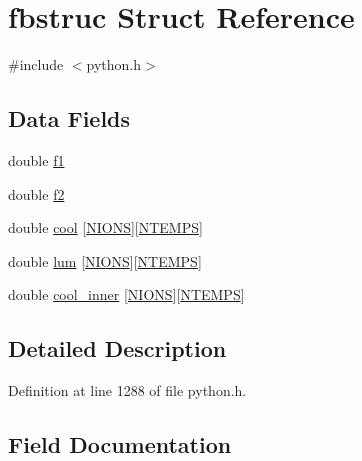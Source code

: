 \hypertarget{structfbstruc}{}\section{fbstruc Struct Reference}
\label{structfbstruc}


{\ttfamily \#include $<$python.\+h$>$}

\subsection*{Data Fields}
\begin{DoxyCompactItemize}
\item 
double \hyperlink{structfbstruc_a00049c608d6d413ff278c4ad85c2dfdd}{f1}
\item 
double \hyperlink{structfbstruc_abbce27eacdec4c677886d24a20aac51c}{f2}
\item 
double \hyperlink{structfbstruc_ae84f43ceb4d2e546af5cff8ffefa903d}{cool} \mbox{[}\hyperlink{atomic_8h_ac6a37b9ae25d11bf2521d8ee85c46d79}{N\+I\+O\+NS}\mbox{]}\mbox{[}\hyperlink{python_8h_aed80336ab0bdf84ca8d3c4c333430a7b}{N\+T\+E\+M\+PS}\mbox{]}
\item 
double \hyperlink{structfbstruc_a9821ceb0012fdc62fd355f8e4c51a437}{lum} \mbox{[}\hyperlink{atomic_8h_ac6a37b9ae25d11bf2521d8ee85c46d79}{N\+I\+O\+NS}\mbox{]}\mbox{[}\hyperlink{python_8h_aed80336ab0bdf84ca8d3c4c333430a7b}{N\+T\+E\+M\+PS}\mbox{]}
\item 
double \hyperlink{structfbstruc_acb616be77cf6fed83e53426144683bd5}{cool\+\_\+inner} \mbox{[}\hyperlink{atomic_8h_ac6a37b9ae25d11bf2521d8ee85c46d79}{N\+I\+O\+NS}\mbox{]}\mbox{[}\hyperlink{python_8h_aed80336ab0bdf84ca8d3c4c333430a7b}{N\+T\+E\+M\+PS}\mbox{]}
\end{DoxyCompactItemize}


\subsection{Detailed Description}


Definition at line 1288 of file python.\+h.



\subsection{Field Documentation}
\mbox{\label{structfbstruc_ae84f43ceb4d2e546af5cff8ffefa903d}} 
